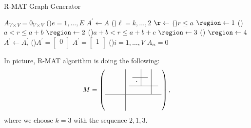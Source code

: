 \begin{algorithm}[H]\label{algo:R-MAT-graph-generator-algo}
	\DontPrintSemicolon
	\caption{R-MAT Graph Generator}
	\BlankLine

	\(A_{V\times V} = 0_{V \times V}\) 
	\;
	\For(){\(e= 1, \dots , E\)}{
		\(A^\prime \gets A\)\;
		\For(){\(\ell = k, \dots , 2\)}{
			\(\r\gets \)\rand{\([0, 1]\)} \;
			\uIf(){\(r\leq a\) }{
				\(\region\gets 1\)\;
			}\uElseIf(){\(a < r \leq  a + b\)}{
				\(\region\gets 2\)\;
			}\uElseIf(){\(a + b < r \leq  a + b + c\)}{
				\(\region\gets 3\)\;
			}\Else(){
				\(\region\gets 4\)\;
			}
			\(A^\prime \gets A^\prime_i\)
		}
		\If(){\(A^\prime = \begin{bmatrix}0 \\\end{bmatrix}\)}{
			\(A^\prime = \begin{bmatrix}1 \\ \end{bmatrix}\)
		}
	}
	\;
	\For(){\(i = 1, \dots, V\)}{
		\(A_{ii} = 0\)\label{algo:R-MAT-graph-generator-algo-clean-up}
	}
	\;
\end{algorithm}

\begin{eg}
	In picture, \hyperref[algo:R-MAT-graph-generator-algo]{R-MAT algorithm} is doing the following:
	\[
		M = \left(
		\begin{array}{c|c}
				\begin{array}{cc}
					 & \\
					 &
				\end{array} & \begin{array}{c|c}
					              \begin{array}{c|c}
						      & \\
						\hline
						\cdot &
					\end{array} &    \\
					              \hline
					                                 &
				              \end{array} \\
				\hline
				\begin{array}{cc}
					 & \\
					 &
				\end{array} & \begin{array}{cc}
					               & \\
					               &
				              \end{array}
			\end{array}
		\right),
	\]
	where we choose \(k = 3\) with the sequence \(2, 1, 3\).
\end{eg}

